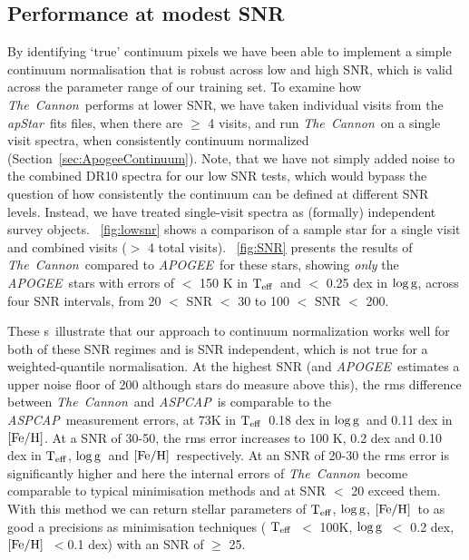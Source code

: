 \documentclass[12pt, preprint]{aastex}
\newcommand{\sectionname}{Section}
\newcommand{\figurenames}{\figurename s}
\newcommand{\tc}{\textsl{The~Cannon}}
\newcommand{\apogee}{\textsl{APOGEE}}
\newcommand{\aspcap}{\textsl{ASPCAP}}
\newcommand{\apstar}{\textsl{apStar}}
\newcommand{\teff}{\mbox{$\rm T_{eff}$}}
\newcommand{\feh}{\mbox{$\rm [Fe/H]$}}
\newcommand{\logg}{\mbox{$\rm \log g$}}
\begin{document}
 \subsection{Performance at modest SNR}
 \label{sec:lowSNR}


By identifying `true' continuum pixels we have been able to implement a simple continuum normalisation that is robust across low and high SNR, which is valid across the parameter range of our training set. To examine how \tc\ performs at lower SNR, we have taken individual visits from the \apstar\ fits files, when there are $\ge$ 4 visits, and run \tc\ on a single visit spectra, when consistently continuum normalized (\sectionname~\ref{sec:ApogeeContinuum}). Note, that we have not simply added noise to the combined DR10 spectra for our low SNR tests, which would bypass the question of how consistently the continuum can be defined at different SNR levels. Instead, we have treated single-visit spectra as (formally) independent survey objects. \figurename~\ref{fig:lowsnr} shows a comparison of a sample star for a single visit and combined visits ($>$ 4 total visits). \figurename~\ref{fig:SNR} presents the results of \tc\ compared to \apogee\ for these stars, showing \textit{only} the \apogee\ stars with errors of $<$ 150 K in \teff\ and $<$ 0.25 dex in \logg, across four SNR intervals, from 20 $<$ SNR $<$ 30 to 100 $<$ SNR $<$ 200.

These \figurenames\ illustrate that our approach to continuum normalization works well for both of these SNR regimes and is SNR independent, which is not true for a weighted-quantile normalisation. At the highest SNR (and \apogee\ estimates a upper noise floor of 200 although stars do measure above this), the rms difference between \tc\ and \aspcap\ is comparable to the \aspcap\ measurement errors, at 73K in \teff\, 0.18 dex in \logg\ and 0.11 dex in \feh. At a SNR of 30-50, the rms error increases to 100 K, 0.2 dex and 0.10 dex in \teff, \logg\ and \feh\, respectively. At an SNR of 20-30 the rms error is significantly higher and here the internal errors of \tc\ become comparable to typical minimisation methods and at SNR $<$ 20 exceed them. With this method we can return stellar parameters of \teff, \logg, \feh\ to as good a precisions as minimisation techniques ( \teff\ $<$ 100K, \logg\ $<$ 0.2 dex, \feh\ $< $0.1 dex) with an SNR of $\ge$ 25. 
 
\end{document}
